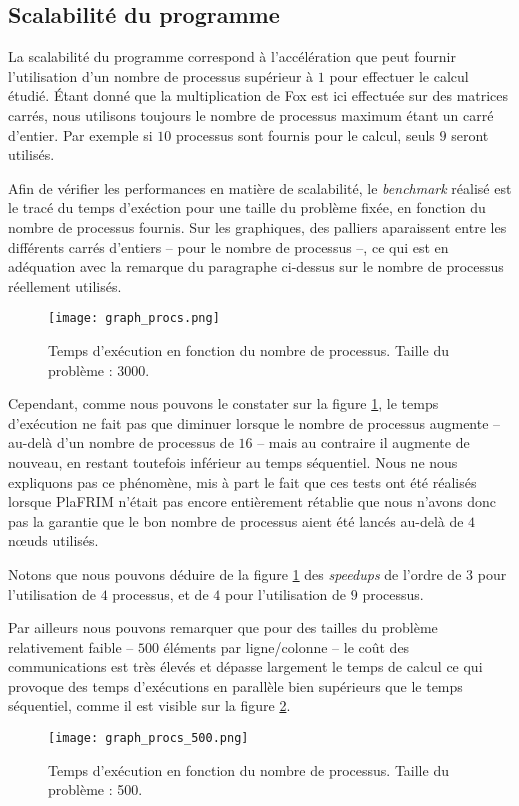 \subsection{Scalabilité du programme}

La scalabilité du programme correspond à l'accélération que peut fournir l'utilisation d'un nombre de processus supérieur à $1$ pour effectuer le calcul étudié. \'Etant donné que la multiplication de Fox est ici effectuée sur des matrices carrés, nous utilisons toujours le nombre de processus maximum étant un carré d'entier. Par exemple si $10$ processus sont fournis pour le calcul, seuls $9$ seront utilisés.

Afin de vérifier les performances en matière de scalabilité, le \emph{benchmark} réalisé est le tracé du temps d'exéction pour une taille du problème fixée, en fonction du nombre de processus fournis. Sur les graphiques, des palliers aparaissent entre les différents carrés d'entiers -- pour le nombre de processus --, ce qui est en adéquation avec la remarque du paragraphe ci-dessus sur le nombre de processus réellement utilisés. 

\begin{figure}
\begin{center}
\texttt{[image: graph\_procs.png]}
\caption{Temps d'exécution en fonction du nombre de processus. Taille du problème : 3000.}
\label{graph:procs}
\end{center}
\end{figure}

Cependant, comme nous pouvons le constater sur la figure \ref{graph:procs}, le temps d'exécution ne fait pas que diminuer lorsque le nombre de processus augmente -- au-delà d'un nombre de processus de $16$ -- mais au contraire il augmente de nouveau, en restant toutefois inférieur au temps séquentiel. Nous ne nous expliquons pas ce phénomène, mis à part le fait que ces tests ont été réalisés lorsque PlaFRIM n'était pas encore entièrement rétablie que nous n'avons donc pas la garantie que le bon nombre de processus aient été lancés au-delà de $4$ n\oe uds utilisés.

Notons que nous pouvons déduire de la figure \ref{graph:procs} des \emph{speedups} de l'ordre de $3$ pour l'utilisation de $4$ processus, et de $4$ pour l'utilisation de $9$ processus.

Par ailleurs nous pouvons remarquer que pour des tailles du problème relativement faible -- $500$ éléments par ligne/colonne -- le coût des communications est très élevés et dépasse largement le temps de calcul ce qui provoque des temps d'exécutions en parallèle bien supérieurs que le temps séquentiel, comme il est visible sur la figure \ref{graph:proc}.

\begin{figure}
\begin{center}
\texttt{[image: graph\_procs\_500.png]}
\caption{Temps d'exécution en fonction du nombre de processus. Taille du problème : 500.}
\label{graph:proc}
\end{center}
\end{figure}

